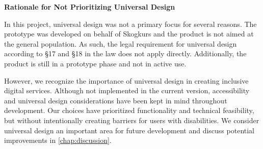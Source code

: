 \textbf{Rationale for Not Prioritizing Universal Design}

In this project, universal design was not a primary focus for several reasons. The prototype was developed on behalf of Skogkurs and the product is not aimed at the general population. As such, the legal requirement for universal design according to §17 and §18 in the law does not apply directly. Additionally, the product is still in a prototype phase and not in active use.

However, we recognize the importance of universal design in creating inclusive digital services. Although not implemented in the current version, accessibility and universal design considerations have been kept in mind throughout development. Our choices have prioritized functionality and technical feasibility, but without intentionally creating barriers for users with disabilities. We consider universal design an important area for future development and discuss potential improvements in \autoref{chap:discussion}.
